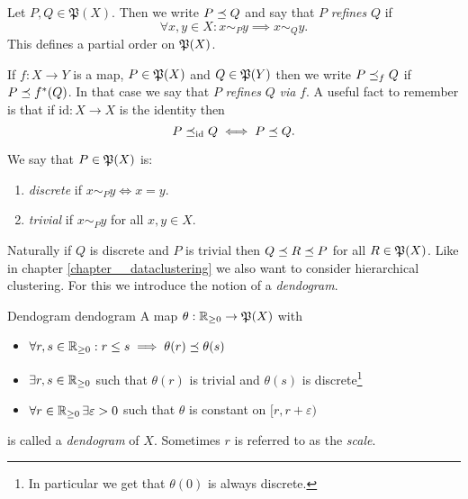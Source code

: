 \begin{definition}{}{}
Let $P, Q \in \mathfrak{P}(X)$. Then we write $P \refines Q$ and say that $P$ \emph{refines} $Q$ if
\begin{equation*}
    \forall x,y \in X: x \sim_P y \implies x \sim_Q y.
\end{equation*}
This defines a partial order on $\P(X)$.
\end{definition}
If $f: X \to Y$ is a map, $P \in \P(X)$ and $Q \in \P(Y)$ then we write $P \refines_f Q$ if $P \refines f^*(Q)$. In that case we say that $P$ \emph{refines} $Q$ \emph{via} $f$. A useful fact to remember is that if $\mathrm{id}: X \to X$ is the identity then
\begin{equation}
    \label{eq:refinement_via_identity}
    P \refines_{\mathrm{id}} Q \iff P \refines Q.
\end{equation}
\begin{definition}{}{}
We say that $P \in \P(X)$ is:
\begin{enumerate}
    \item \emph{discrete} if $x \sim_P y \iff x = y$.
    \item \emph{trivial} if $x \sim_P y$ for all $x,y \in X$.
\end{enumerate}
\end{definition}

Naturally if $Q$ is discrete and $P$ is trivial then $Q \refines R \refines P$ for all $R \in \P(X)$.
Like in chapter \ref{chapter__dataclustering} we also want to consider hierarchical clustering.
For this we introduce the notion of a \emph{dendogram}.

\begin{definition}{Dendogram \cite[Def.~2.2]{Carlsson2010}}{dendogram}
A map $\theta: \R_{\geq0} \to \mathfrak{P}(X)$ with
\begin{itemize}
    \item $\forall r,s \in \R_{\geq0}: r \leq s \implies  \theta(r) \refines \theta(s)$
    \item $\exists r,s \in \R_{\geq0}$ such that $\theta(r)$ is trivial and $\theta(s)$ is discrete\footnote{In particular we get that $\theta(0)$ is always discrete.}
    \item $\forall r \in \R_{\geq0} \,\exists \varepsilon > 0$ such that $\theta$ is constant on $[r, r + \varepsilon)$
\end{itemize}
is called a \emph{dendogram} of $X$. Sometimes $r$ is referred to as the \emph{scale}.
\end{definition}

